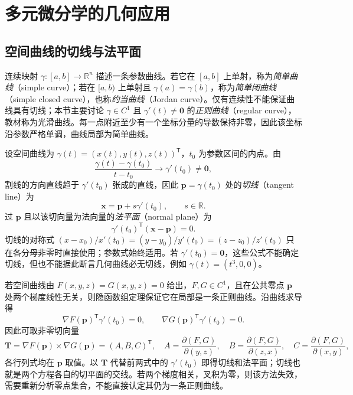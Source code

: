 \documentclass[UTF8,12pt,a4paper,fontset=fandol]{ctexbook}
\begin{document}
\section{多元微分学的几何应用}
\label{sec:geometric-applications-of-multivariable-differentiation}


\subsection{空间曲线的切线与法平面}
\label{subsec:tangent-lines-and-normal-planes-of-space-curves}

连续映射 $\gamma:[a,b]\to\mathbb R^n$ 描述一条参数曲线。若它在 $[a,b]$ 上单射，称为\emph{简单曲线}（simple curve）；若在 $[a,b)$ 上单射且 $\gamma(a)=\gamma(b)$，称为\emph{简单闭曲线}（simple closed curve），也称\emph{约当曲线}（Jordan curve）。仅有连续性不能保证曲线具有切线；本节主要讨论 $\gamma\in C^1$ 且 $\gamma'(t)\ne\boldsymbol0$ 的\emph{正则曲线}（regular curve），教材称为光滑曲线。每一点附近至少有一个坐标分量的导数保持非零，因此该坐标沿参数严格单调，曲线局部为简单曲线。

设空间曲线为 $\gamma(t)=(x(t),y(t),z(t))^{\mathsf T}$，$t_0$ 为参数区间的内点。由
\[
    \frac{\gamma(t)-\gamma(t_0)}{t-t_0}\longrightarrow\gamma'(t_0)\ne\boldsymbol0,
\]
割线的方向直线趋于 $\gamma'(t_0)$ 张成的直线，因此 $\boldsymbol p=\gamma(t_0)$ 处的\emph{切线}（tangent line）为
\begin{equation}
\label{eq:space-curve-tangent-ch14}
    \boldsymbol x=\boldsymbol p+s\gamma'(t_0),\qquad s\in\mathbb R.
\end{equation}
过 $\boldsymbol p$ 且以该切向量为法向量的\emph{法平面}（normal plane）为
\begin{equation}
\label{eq:space-curve-normal-plane-ch14}
    \gamma'(t_0)^{\mathsf T}(\boldsymbol x-\boldsymbol p)=0.
\end{equation}
切线的对称式 $(x-x_0)/x'(t_0)=(y-y_0)/y'(t_0)=(z-z_0)/z'(t_0)$ 只在各分母非零时直接使用；参数式始终适用。若 $\gamma'(t_0)=\boldsymbol0$，这些公式不能确定切线，但也不能据此断言几何曲线必无切线，例如 $\gamma(t)=(t^3,0,0)$。

若空间曲线由 $F(x,y,z)=G(x,y,z)=0$ 给出，$F,G\in C^1$，且在公共零点 $\boldsymbol p$ 处两个梯度线性无关，则隐函数组定理保证它在局部是一条正则曲线。沿曲线求导得
\[
    \nabla F(\boldsymbol p)^{\mathsf T}\gamma'(t_0)=0,\qquad
    \nabla G(\boldsymbol p)^{\mathsf T}\gamma'(t_0)=0.
\]
因此可取非零切向量
\begin{equation}
\label{eq:implicit-curve-tangent-vector-ch14}
    \boldsymbol T=\nabla F(\boldsymbol p)\times\nabla G(\boldsymbol p)
      =(A,B,C)^{\mathsf T},\quad
    A=\frac{\partial(F,G)}{\partial(y,z)},\quad
    B=\frac{\partial(F,G)}{\partial(z,x)},\quad
    C=\frac{\partial(F,G)}{\partial(x,y)},
\end{equation}
各行列式均在 $\boldsymbol p$ 取值。以 $\boldsymbol T$ 代替前两式中的 $\gamma'(t_0)$ 即得切线和法平面；切线也就是两个方程各自的切平面的交线。若两个梯度相关，叉积为零，则该方法失效，需要重新分析零点集合，不能直接认定其仍为一条正则曲线。
\end{document}
